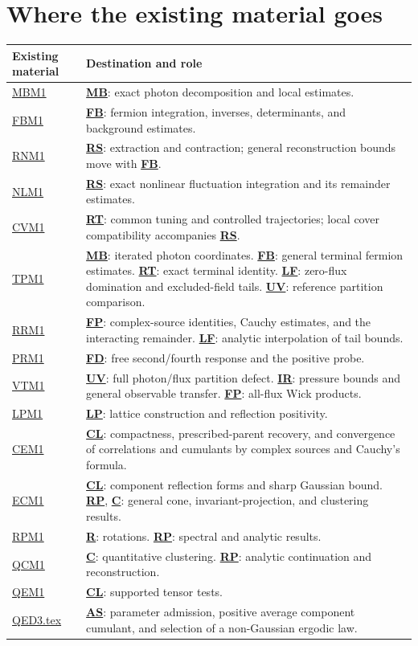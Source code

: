 \documentclass[11pt]{article}
\newcommand{\Code}[1]{\hyperlink{block-#1}{\textbf{#1}}}
\newcommand{\Repo}{https://github.com/ethanwsussman/Yang--Mills-LLM-experiment}
\newcommand{\Old}[2]{\href{\Repo/#1}{#2}}
\newcommand{\MBsource}{\Old{tree/main/QED3/OLD/Submanuscripts/Maxwell\%20block\%20analysis\%20\%28MB1\%29}{MBM1}}
\newcommand{\FBsource}{\Old{tree/main/QED3/OLD/Submanuscripts/Chamber\%20fermion\%20block\%20analysis\%20\%28FB1\%29}{FBM1}}
\newcommand{\RNsource}{\Old{tree/main/QED3/OLD/Submanuscripts/Relevant\%20extraction\%20and\%20normalized\%20contraction\%20\%28RN1\%29}{RNM1}}
\newcommand{\NLsource}{\Old{tree/main/QED3/OLD/Submanuscripts/Nonlinear\%20renormalization\%20step\%20\%28NL1\%29}{NLM1}}
\newcommand{\CVsource}{\Old{tree/main/QED3/OLD/Submanuscripts/Cover\%20agreement\%20and\%20common\%20tuning\%20\%28CV1\%29}{CVM1}}
\newcommand{\TPsource}{\Old{tree/main/QED3/OLD/Submanuscripts/Terminal\%20measure\%20and\%20pressure\%20\%28TP1\%29}{TPM1}}
\newcommand{\RRsource}{\Old{tree/main/QED3/OLD/Submanuscripts/Reference\%20response\%20\%28RR1\%29}{RRM1}}
\newcommand{\PRsource}{\Old{tree/main/QED3/OLD/Submanuscripts/Positive\%20probes\%20and\%20free\%20response\%20\%28PR1\%29}{PRM1}}
\newcommand{\VTsource}{\Old{tree/main/QED3/OLD/Submanuscripts/Volume\%20transfer\%20\%28VT1\%29}{VTM1}}
\newcommand{\LPsource}{\Old{tree/main/QED3/OLD/Submanuscripts/Infinite-lattice\%20reflection\%20positivity\%20\%28LP1\%29}{LPM1}}
\newcommand{\CEsource}{\Old{tree/main/QED3/OLD/Submanuscripts/Continuum\%20existence\%20\%28CE1\%29}{CEM1}}
\newcommand{\ECsource}{\Old{tree/main/QED3/OLD/Submanuscripts/Continuum\%20components\%20and\%20clustering\%20\%28EC1\%29}{ECM1}}
\newcommand{\RPsource}{\Old{blob/main/RP\%20O\%28d\%29\%20trick\%20\%28RP1\%29/RPM1.tex}{RPM1}}
\newcommand{\QCsource}{\Old{blob/main/QED3/QED3_supplement.tex}{QCM1}}
\newcommand{\QEsource}{\Old{blob/main/QED3/OLD/QEM1.tex}{QEM1}}
\newcommand{\CurrentQEsource}{\Old{blob/main/QED3/QED3.tex}{QED3.tex}}
\begin{document}
\section*{Where the existing material goes}
\par\small\renewcommand{\arraystretch}{1.2}
\begin{tabularx}{\textwidth}{@{}p{31mm} X@{}}
\toprule
Existing material & Destination and role\\
\midrule
\MBsource & \Code{MB}: exact photon decomposition and local estimates.\\
\FBsource & \Code{FB}: fermion integration, inverses, determinants, and
background estimates.\\
\RNsource & \Code{RS}: extraction and contraction; general reconstruction
bounds move with \Code{FB}.\\
\NLsource & \Code{RS}: exact nonlinear fluctuation integration and its
remainder estimates.\\
\CVsource & \Code{RT}: common tuning and controlled trajectories;
local cover compatibility accompanies \Code{RS}.\\
\TPsource & \Code{MB}: iterated photon coordinates.
\Code{FB}: general terminal fermion estimates.
\Code{RT}: exact terminal identity.
\Code{LF}: zero-flux domination and excluded-field tails.
\Code{UV}: reference partition comparison.\\
\RRsource & \Code{FP}: complex-source identities, Cauchy estimates, and
the interacting remainder. \Code{LF}: analytic interpolation of tail bounds.\\
\PRsource & \Code{FD}: free second/fourth response and the positive probe.\\
\VTsource & \Code{UV}: full photon/flux partition defect.
\Code{IR}: pressure bounds and general observable transfer.
\Code{FP}: all-flux Wick products.\\
\LPsource & \Code{LP}: lattice construction and reflection positivity.\\
\CEsource & \Code{CL}: compactness, prescribed-parent recovery, and
convergence of correlations and cumulants by complex sources and Cauchy's formula.\\
\ECsource & \Code{CL}: component reflection forms and sharp Gaussian bound.
\Code{RP}, \Code{C}: general cone, invariant-projection, and clustering results.\\
\RPsource & \Code{R}: rotations. \Code{RP}: spectral and analytic results.\\
\QCsource & \Code{C}: quantitative clustering. \Code{RP}: analytic continuation and reconstruction.\\
\QEsource & \Code{CL}: supported tensor tests.\\
\CurrentQEsource & \Code{AS}: parameter admission, positive average
component cumulant, and selection of a non-Gaussian ergodic law.\\
\bottomrule
\end{tabularx}
\par\normalsize
\end{document}
